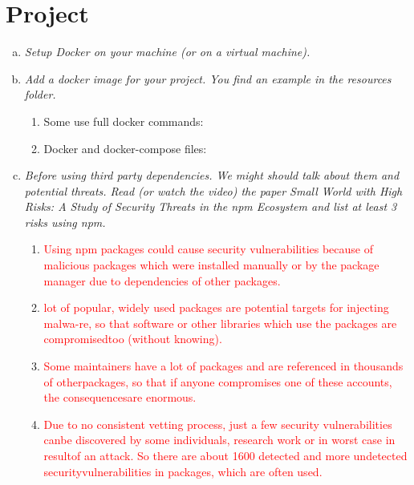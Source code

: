 \section{Project}
\begin{enumerate}[(a)]
    \item \itshape{Setup Docker on your machine (or on a virtual machine).}
    
    \item \itshape{Add a docker image for your project. You find an example in the resources folder.}
    \begin{enumerate}
        \item Some use full docker commands:
        
        \item Docker and docker-compose files:
        
        
        \newpage
        
    \end{enumerate}
    \item \itshape{Before using third party dependencies. We might should talk about them and potential threats. Read (or watch the video) the paper Small World with High Risks: A Study of Security Threats in the npm Ecosystem and list at least 3 risks using npm.}
    \begin{enumerate}[1.]
        \item \textcolor{red}{Using npm packages could cause security vulnerabilities because of malicious packages  which  were  installed  manually  or  by  the  package  manager  due  to dependencies of other packages.}
        \item \textcolor{red}{lot of popular, widely used packages are potential targets for injecting malwa-re, so that software or other libraries which use the packages are compromisedtoo (without knowing).}
        \item \textcolor{red}{Some maintainers have a lot of packages and are referenced in thousands of otherpackages, so that if anyone compromises one of these accounts, the consequencesare enormous.}
        \item \textcolor{red}{Due  to  no  consistent  vetting  process,  just  a  few  security  vulnerabilities  canbe  discovered  by  some  individuals,  research  work  or  in  worst  case  in  resultof an attack. So there are about 1600 detected and more undetected securityvulnerabilities in packages, which are often used.}

\end{enumerate}
\end{enumerate}
